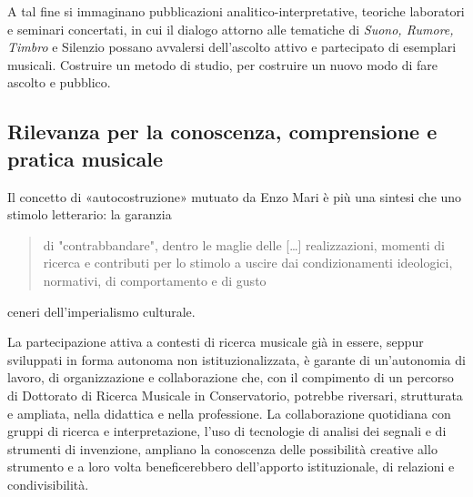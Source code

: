 \documentclass{gs-adonis}
\begin{document}
A tal fine si immaginano pubblicazioni analitico-interpretative, teoriche
laboratori e seminari concertati, in cui il dialogo attorno alle
tematiche di \emph{Suono, Rumore, Timbro} e Silenzio possano avvalersi dell'ascolto
attivo e partecipato di esemplari musicali. Costruire un metodo di studio, per
costruire un nuovo modo di fare ascolto e pubblico.

\subsection{Rilevanza per la conoscenza, comprensione e pratica musicale}



Il concetto di «autocostruzione» mutuato da Enzo Mari \cite{mari2002} è più una
sintesi che uno stimolo letterario: la garanzia

\begin{quote}
  di "contrabbandare", dentro le maglie delle […] realizzazioni, momenti di
  ricerca e contributi per lo stimolo a uscire dai condizionamenti ideologici,
  normativi, di comportamento e di gusto
\end{quote}

ceneri dell'imperialismo culturale.

La partecipazione attiva a contesti di ricerca musicale già in essere, seppur
sviluppati in forma autonoma non istituzionalizzata, è garante di un'autonomia
di lavoro, di organizzazione e collaborazione che, con il compimento di un
percorso di Dottorato di Ricerca Musicale in Conservatorio, potrebbe riversari,
strutturata e ampliata, nella didattica e nella professione. La collaborazione
quotidiana con gruppi di ricerca e interpretazione, l'uso di tecnologie di
analisi dei segnali e di strumenti di invenzione, ampliano la conoscenza
delle possibilità creative allo strumento e a loro volta beneficerebbero
dell'apporto istituzionale, di relazioni e condivisibilità.

\end{document}
